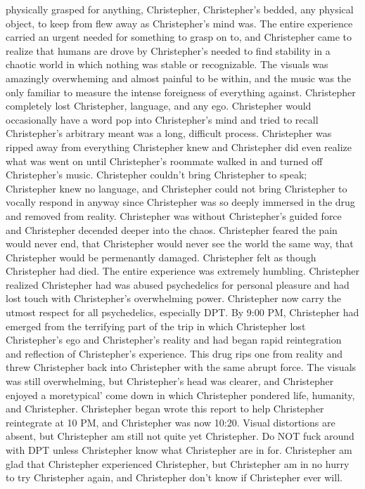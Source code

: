 \documentclass[12pt]{book}
\begin{document}
physically grasped for anything, Christepher, Christepher's bedded, any physical object, to keep from flew away as Christepher's mind was. The entire experience carried an urgent needed for something to grasp on to, and Christepher came to realize that humans are drove by Christepher's needed to find stability in a chaotic world in which nothing was stable or recognizable. The visuals was amazingly overwheming and almost painful to be within, and the music was the only familiar to measure the intense foreigness of everything against. Christepher completely lost Christepher, language, and any ego. Christepher would occasionally have a word pop into Christepher's mind and tried to recall Christepher's arbitrary meant was a long, difficult process. Christepher was ripped away from everything Christepher knew and Christepher did even realize what was went on until Christepher's roommate walked in and turned off Christepher's music. Christepher couldn't bring Christepher to speak; Christepher knew no language, and Christepher could not bring Christepher to vocally respond in anyway since Christepher was so deeply immersed in the drug and removed from reality. Christepher was without Christepher's guided force and Christepher decended deeper into the chaos. Christepher feared the pain would never end, that Christepher would never see the world the same way, that Christepher would be permenantly damaged. Christepher felt as though Christepher had died. The entire experience was extremely humbling. Christepher realized Christepher had was abused psychedelics for personal pleasure and had lost touch with Christepher's overwhelming power. Christepher now carry the utmost respect for all psychedelics, especially DPT. By 9:00 PM, Christepher had emerged from the terrifying part of the trip in which Christepher lost Christepher's ego and Christepher's reality and had began rapid reintegration and reflection of Christepher's experience. This drug rips one from reality and threw Christepher back into Christepher with the same abrupt force. The visuals was still overwhelming, but Christepher's head was clearer, and Christepher enjoyed a moretypical' come down in which Christepher pondered life, humanity, and Christepher. Christepher began wrote this report to help Christepher reintegrate at 10 PM, and Christepher was now 10:20. Visual distortions are absent, but Christepher am still not quite yet Christepher. Do NOT fuck around with DPT unless Christepher know what Christepher are in for. Christepher am glad that Christepher experienced Christepher, but Christepher am in no hurry to try Christepher again, and Christepher don't know if Christepher ever will.
\end{document}
